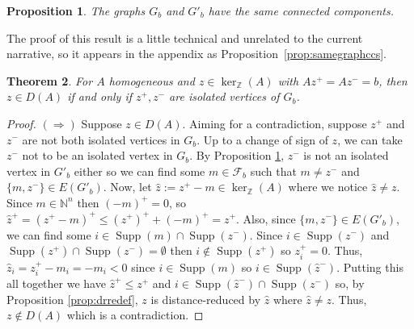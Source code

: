 \documentclass[a4paper, 12pt]{article}
\newcommand{\NN}{\mathbb N}
\newcommand{\ZZ}{\mathbb Z}
\theoremstyle{plain}
\newtheorem{theorem}{Theorem}[section]
\newtheorem{proposition}[theorem]{Proposition}
\theoremstyle{definition}
\theoremstyle{remark}
\begin{document}
\begin{proposition} \label{prop:3graphs}
    The graphs $G_b$ and $G'_b$ have the same connected components.
\end{proposition}

The proof of this result is a little technical and unrelated to the current narrative, so it appears in the appendix as Proposition~\ref{prop:samegraphccs}.

\begin{theorem}\label{thm:DAexact}
    For $A$ homogeneous and $z \in \ker_\ZZ(A)$ with $Az^+=Az^-=b$, then $z \in D(A)$ if and only if $z^+,z^-$ are isolated vertices of $G_b$.
\end{theorem}

\begin{proof}
     $(\Longrightarrow)$ Suppose $z \in D(A)$. Aiming for a contradiction, suppose $z^+$ and $z^-$ are not both isolated vertices in $G_b$. Up to a change of sign of $z$, we can take $z^-$ not to be an isolated vertex in $G_b$. By Proposition \ref{prop:3graphs}, $z^-$ is not an isolated vertex in $G'_b$ either so we can find some $m \in \mathcal{F}_b$ such that $m \neq z^-$ and $\{m,z^-\} \in E(G'_b)$. Now, let $\hat z:=z^+-m \in \ker_\ZZ(A)$ where we notice $\hat z \neq z$. Since $m \in \NN^n$ then $(-m)^+=0$, so $\hat z^+=(z^+-m)^+ \le (z^+)^+ + (-m)^+=z^+$. Also, since $\{m,z^-\} \in E(G'_b)$, we can find some $i \in \operatorname{Supp}(m) \cap \operatorname{Supp}(z^-)$. Since $i \in \operatorname{Supp}(z^-)$ and $\operatorname{Supp}(z^+) \cap \operatorname{Supp}(z^-)=\emptyset$ then $i \not\in \operatorname{Supp}(z^+)$ so $z^+_i=0$. Thus, $\hat z_i=z^+_i-m_i=-m_i<0$ since $i \in \operatorname{Supp}(m)$ so $i \in \operatorname{Supp}(\hat z^-)$. Putting this all together we have $\hat z^+ \le z^+$ and $i \in \operatorname{Supp}(\hat z^-) \cap \operatorname{Supp}(z^-)$ so, by Proposition \ref{prop:drredef}, $z$ is distance-reduced by $\hat z$ where $\hat z \neq z$. Thus, $z \not\in D(A)$ which is a contradiction.
    

\end{proof}
\end{document}
